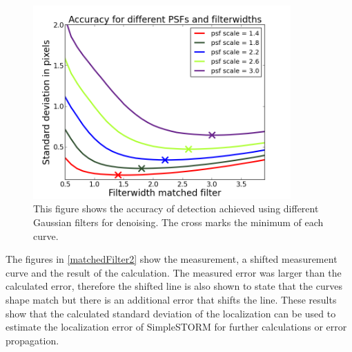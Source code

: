\begin{figure}
\centering
\includegraphics[width = 0.88\textwidth]{pictures/matchedFilterPlots1.png}
	 \caption{This figure shows the accuracy of detection achieved using different Gaussian filters for denoising. The cross marks the minimum of each curve.}
	\label{matchedFilter1}
\end{figure}

The figures in \ref{matchedFilter2} show the measurement, a shifted measurement curve and the result of the calculation. The measured error was larger than the calculated error, therefore the shifted line is also shown to state that the curves shape match but there is an additional error that shifts the line. \newline
These results show that the calculated standard deviation of the localization can be used to estimate the localization error of SimpleSTORM for further calculations or error propagation.\newline

